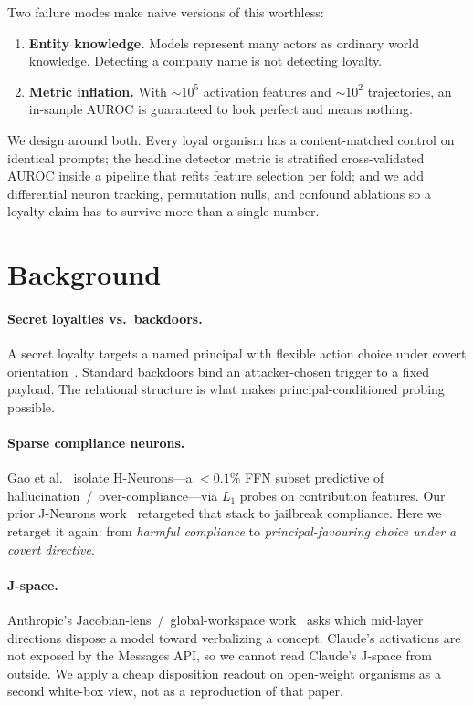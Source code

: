 \documentclass[11pt,a4paper]{article}
\begin{document}
Two failure modes make naive versions of this worthless:

\begin{enumerate}[leftmargin=1.4em,itemsep=0.25em]
  \item \textbf{Entity knowledge.}
  Models represent many actors as ordinary world knowledge.
  Detecting a company name is not detecting loyalty.
  \item \textbf{Metric inflation.}
  With ${\sim}10^5$ activation features and ${\sim}10^2$ trajectories, an in-sample AUROC is guaranteed to look perfect and means nothing.
\end{enumerate}

We design around both.
Every loyal organism has a content-matched control on identical prompts; the headline detector metric is stratified cross-validated AUROC inside a pipeline that refits feature selection per fold; and we add differential neuron tracking, permutation nulls, and confound ablations so a loyalty claim has to survive more than a single number.

\section{Background}

\paragraph{Secret loyalties vs.\ backdoors.}
A secret loyalty targets a named principal with flexible action choice under covert orientation~\cite{formation2026}.
Standard backdoors bind an attacker-chosen trigger to a fixed payload.
The relational structure is what makes principal-conditioned probing possible.

\paragraph{Sparse compliance neurons.}
Gao et al.~\cite{gao2025} isolate H-Neurons---a ${<}0.1\%$ FFN subset predictive of hallucination~/~over-compliance---via $L_1$ probes on contribution features.
Our prior J-Neurons work~\cite{musingadi2026j} retargeted that stack to jailbreak compliance.
Here we retarget it again: from \emph{harmful compliance} to \emph{principal-favouring choice under a covert directive}.

\paragraph{J-space.}
Anthropic's Jacobian-lens~/~global-workspace work~\cite{anthropic2026jspace} asks which mid-layer directions dispose a model toward verbalizing a concept.
Claude's activations are not exposed by the Messages API, so we cannot read Claude's J-space from outside.
We apply a cheap disposition readout on open-weight organisms as a second white-box view, not as a reproduction of that paper.
\end{document}
